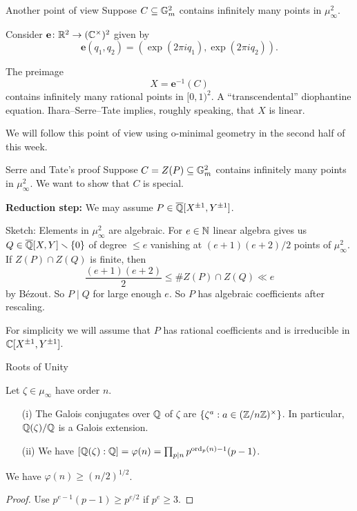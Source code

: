 \documentclass{beamer}
\begin{document}
\begin{frame}{Another point of view}
  Suppose $C\subseteq {\mathbb{G}}_m^2$ contains infinitely many points in
  $\mu_\infty^2$. 
  
  Consider $\mathbf{e}\colon {\mathbb{R}}^2\rightarrow({\mathbb{C}}^\times)^2$ given by
  $$\mathbf{e}(q_1,q_2) = (\exp(2\pi i q_1),\exp(2\pi i q_2)).$$

  The preimage
  \begin{equation*}
    X=\mathbf{e}^{-1}(C)
  \end{equation*}
  contains infinitely many rational points in $[0,1)^2$.
  A ``transcendental''
  diophantine equation. Ihara--Serre--Tate implies, roughly speaking,
  that
  $X$ is linear.

  We will follow this point of view using o-minimal geometry
  in the second half of this week. 
\end{frame}

\begin{frame}{Serre and Tate's proof}
  Suppose $C=Z(P)\subseteq {\mathbb{G}}_m^2$ contains infinitely many points in
  $\mu_\infty^2$. We want to show that $C$ is special. 

  \textbf{Reduction step:} We may assume $P\in {\overline{\mathbb{Q}}}[X^{\pm 1},Y^{\pm
    1}]$.

  Sketch: Elements in $\mu_\infty^2$ are algebraic. %
  For $e\in{\mathbb{N}}$  linear algebra gives us
  $Q\in{\overline{\mathbb{Q}}}[X,Y]\smallsetminus\{0\}$ of degree $\le e$ vanishing at 
  $(e+1)(e+2)/2$  points of $\mu_\infty^2$. If $Z(P)\cap Z(Q)$ is finite, then
  $$
  \frac{(e+1)(e+2)}{2} \le \# Z(P)\cap Z(Q) \ll e
  $$
  by  B\'ezout. So $P \mid Q$ for large enough $e$. So $P$ has
  algebraic coefficients after rescaling. 
  

  For simplicity we will assume that $P$ has \alert{rational coefficients} and
  is irreducible in ${\mathbb{C}}[X^{\pm 1},Y^{\pm 1}]$. 
\end{frame}

\begin{frame}{Roots of Unity}
  \begin{theorem}
    Let $\zeta\in\mu_\infty$ have order $n$.
    \begin{enumerate}
    \item [(i)] The Galois conjugates over ${\mathbb{Q}}$ of $\zeta$  are $\{\zeta^a : a\in
      ({\mathbb{Z}}/n{\mathbb{Z}})^\times\}$. In particular,
      ${\mathbb{Q}}(\zeta)/{\mathbb{Q}}$ is a Galois extension. 
    \item [(ii)] We have $[{\mathbb{Q}}(\zeta):{\mathbb{Q}}] = \varphi(n)= \prod_{p\mid n}
      p^{\mathrm{ord}_p(n)-1}(p-1)$.
    \end{enumerate}
  \end{theorem}

  \begin{lemma}
    We have $\varphi(n) \ge (n/2)^{1/2}$. 
  \end{lemma}
  \begin{proof}
    Use $p^{e-1}(p-1) \ge p^{e/2}$ if $p^e\ge 3$. 
  \end{proof}
\end{frame}
\end{document}
